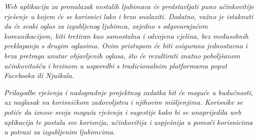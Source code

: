 		\textit{Web aplikacija za pronalazak nestalih ljubimaca će predstavljati puno učinkovitije rješenje u kojem će se korisnici lako i brzo snalaziti. Dodatno, važno je istaknuti da će svaki oglas za izgubljenog ljubimca, zajedno s odgovarajućom komunikacijom, biti tretiran kao samostalna i odvojena cjelina, bez međusobnih preklapanja s drugim oglasima. Ovim pristupom će biti osigurana jednostavna i brza pretraga unutar objavljenih oglasa, što će rezultirati znatno poboljšanom učinkovitošću i brzinom u usporedbi s tradicionalnim platformama poput Facebooka ili Njuškala.}
		
		\textit{Prilagodbe rješenja i nadogradnje projektnog zadatka bit će moguće u budućnosti, uz naglasak na korisničkom zadovoljstvu i njihovim mišljenjima. Korisnike se potiče da iznose svoja moguća rješenja i sugestije kako bi se unaprijedila web aplikacija te postala sve korisnija, učinkovitija i uspješnija u pomoći korisnicima u potrazi za izgubljenim ljubimcima.}
		
		\eject
		
		
	